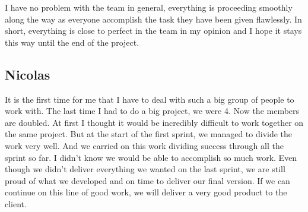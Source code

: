 I have no problem with the team in general, everything is proceeding
smoothly along the way as everyone accomplish the task they have been given
flawlessly. In short, everything is close to perfect in the team in my
opinion and I hope it stays this way until the end of the project.

\subsection{Nicolas}

It is the first time for me that I have to deal with such a big group of
people to work with. The last time I had to do a big project, we were 4.
Now the members are doubled. At first I thought it would be incredibly
difficult to work together on the same project. But at the start of the
first sprint, we managed to divide the work very well. And we carried on
this work dividing success through all the sprint so far. I didn't know we
would be able to accomplish so much work. Even though we didn't deliver
everything we wanted on the last sprint, we are still proud of what we
developed and on time to deliver our final version. If we can continue on
this line of good work, we will deliver a very good product to the client.
